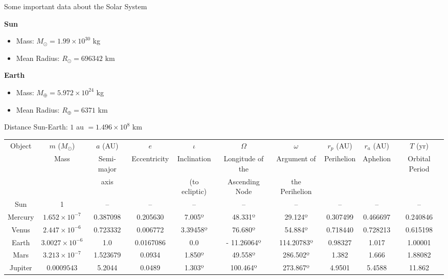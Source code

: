 Some important data about the Solar System 

\textbf{Sun}
\begin{itemize}
\item Mass: $ M_{\odot } = 1.99\times10^{30}$ kg
\item Mean Radius: $R_{\odot } = 696342$ km
\end{itemize}


\textbf{Earth}
\begin{itemize}
\item Mass: $M_{\oplus } = 5.972\times10^{24}$ kg
\item Mean Radius: $R_{\oplus } = 6371$ km
\end{itemize} 

Distance Sun-Earth: $1$ au $= 1.496 \times 10^8$ km

\begin{table}
\renewcommand{\arraystretch}{1.2}
\centering
\begin{tabular}{| c | c | c | c |c | c | c | c | c | c |}
\hline
\multirow{3}{*}{Object} & $m$ ($M_{\odot }$) & $a$ (AU) & $e$  & $\iota $  & $\Omega $ & $\omega $ & $r_p$ (AU) & $r_a$ (AU) & $T$ (yr) \\
 & {\footnotesize Mass} & {\footnotesize Semi-major } & {\footnotesize Eccentricity} & {\footnotesize Inclination }  & {\footnotesize Longitude of the}  & {\footnotesize Argument of } & {\footnotesize Perihelion }& {\footnotesize Aphelion} & {\footnotesize Orbital Period } \\
 & &  {\footnotesize axis }& & {\footnotesize (to ecliptic)}  & {\footnotesize Ascending Node}  & {\footnotesize  the Perihelion} & & &  \\
 \hline
Sun & 1 &	-- &	-- &	 -- &-- & -- & -- & -- & -- \\
Mercury \cite{MercuryData} &$1.652 \times 10^{-7}$	&	0.387098  &	0.205630 &  7.005º & 48.331º & 29.124º & 0.307499 & 0.466697 & 0.240846 \\
Venus \cite{VenusData} & $2.447 \times 10^{-6}$	&	0.723332 & 0.006772 & 3.39458º &	76.680º & 54.884º & 0.718440 & 0.728213 & 0.615198 \\
Earth \cite{EarthData} &$3.0027\times 10^{-6}$&	1.0 & 0.0167086 & 0.0 & - 11.26064º & 114.20783º & 0.98327 & 1.017 &	 1.00001 \\
Mars \cite{MarsData} &	$3.213\times 10^{-7}$&	1.523679 &	 0.0934 & 1.850º & 49.558º &	 286.502º & 1.382 & 1.666 & 1.88082 \\
Jupiter	 \cite{JupiterData}& $0.0009543$ &	5.2044 & 0.0489 & 1.303º & 100.464º & 273.867º & 4.9501 & 5.4588 & 11.862 \\

\end{tabular}
\end{table}
